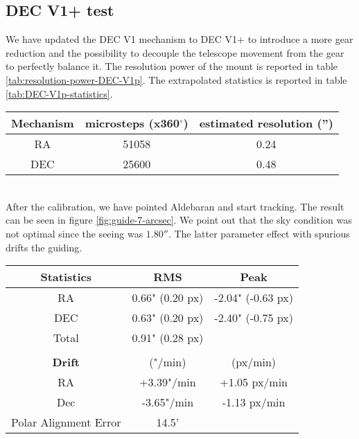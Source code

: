 \subsection{DEC V1+ test}
We have updated the DEC V1 mechanism to DEC V1+ to introduce a more gear reduction and the possibility to decouple the telescope movement from the gear to perfectly balance it.
The resolution power of the mount is reported in table \ref{tab:resolution-power-DEC-V1p}.
The extrapolated statistics is reported in table \ref{tab:DEC-V1p-statistics}.
\\
\begin{minipage}
    {.5\textwidth}
    \begin{tabular}{ccc}
        \textbf{Mechanism} & \textbf{microsteps (x360$^{\circ}$)} &\textbf{estimated resolution ('')}\\
        \hline
        RA  & 51058 & 0.24\\ 
        DEC & 25600 & 0.48
    \end{tabular}
    \label{tab:resolution-power-DEC-V1p}
\end{minipage}
\\
After the calibration, we have pointed Aldebaran and start tracking.
The result can be seen in figure \ref{fig:guide-7-arcsec}.
We point out that the sky condition was not optimal since the seeing was \(1.80''\).
The latter parameter effect with spurious drifts the guiding.
\\
\begin{minipage}{.4\textwidth}
    \centering
    \begin{tabular}{ccc}
        \textbf{Statistics}&RMS&Peak\\
        \hline
        RA   & 0.66" (0.20 px) & -2.04" (-0.63 px)  \\
        DEC  & 0.63" (0.20 px) & -2.40" (-0.75 px) \\
        Total& 0.91" (0.28 px) &\\
        \hline
        \\
        \textbf{Drift}& ("/min) & (px/min)\\
        \hline
        RA& +3.39"/min & +1.05 px/min\\
        Dec& -3.65"/min & -1.13 px/min\\
        Polar Alignment Error&  14.5'&\\
        \hline
    \end{tabular}
    \label{tab:DEC-V1p-statistics}
\end{minipage}